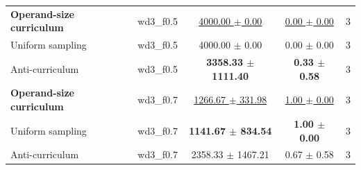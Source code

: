 \begin{tabular}{llccc}
\midrule
\textbf{Operand-size curriculum} & wd3\_f0.5 & \underline{4000.00 $\pm$ 0.00} & \underline{0.00 $\pm$ 0.00} & 3 \\
Uniform sampling & wd3\_f0.5 & 4000.00 $\pm$ 0.00 & 0.00 $\pm$ 0.00 & 3 \\
Anti-curriculum & wd3\_f0.5 & \textbf{3358.33 $\pm$ 1111.40} & \textbf{0.33 $\pm$ 0.58} & 3 \\
\midrule
\textbf{Operand-size curriculum} & wd3\_f0.7 & \underline{1266.67 $\pm$ 331.98} & \underline{1.00 $\pm$ 0.00} & 3 \\
Uniform sampling & wd3\_f0.7 & \textbf{1141.67 $\pm$ 834.54} & \textbf{1.00 $\pm$ 0.00} & 3 \\
Anti-curriculum & wd3\_f0.7 & 2358.33 $\pm$ 1467.21 & 0.67 $\pm$ 0.58 & 3 \\
\bottomrule
\end{tabular}
